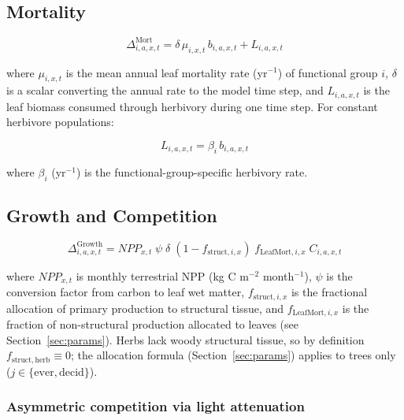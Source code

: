 \documentclass[12pt]{article}
\begin{document}
\subsection{Mortality}

\begin{equation}
    \Delta^{\mathrm{Mort}}_{i,a,x,t} = \delta\,\mu_{i,x,t}\,b_{i,a,x,t}
                                        + L_{i,a,x,t}
    \label{eq:mort}
\end{equation}

where $\mu_{i,x,t}$ is the mean annual leaf mortality rate (yr$^{-1}$) of functional
group $i$, $\delta$ is a scalar converting the annual rate to the model time step,
and $L_{i,a,x,t}$ is the leaf biomass consumed through herbivory during one time step.
For constant herbivore populations:

\begin{equation}
    L_{i,a,x,t} = \beta_i\, b_{i,a,x,t}
    \label{eq:herbivory}
\end{equation}

where $\beta_i$ (yr$^{-1}$) is the functional-group-specific herbivory rate.

\subsection{Growth and Competition}

\begin{equation}
    \Delta^{\mathrm{Growth}}_{i,a,x,t} =
        \mathit{NPP}_{x,t}\;\psi\;\delta\;
        (1 - f_{\mathrm{struct},i,x})\;f_{\mathrm{LeafMort},i,x}\;C_{i,a,x,t}
    \label{eq:growth}
\end{equation}

where $\mathit{NPP}_{x,t}$ is monthly terrestrial NPP (kg C m$^{-2}$ month$^{-1}$),
$\psi$ is the conversion factor from carbon to leaf wet matter, $f_{\mathrm{struct},i,x}$
is the fractional allocation of primary production to structural tissue, and
$f_{\mathrm{LeafMort},i,x}$ is the fraction of non-structural production allocated
to leaves (see Section~\ref{sec:params}). Herbs lack woody structural tissue, so
by definition $f_{\mathrm{struct,herb}} \equiv 0$; the allocation formula
(Section~\ref{sec:params}) applies to trees only ($j \in \{\mathrm{ever, decid}\}$).

\subsubsection*{Asymmetric competition via light attenuation}
\end{document}
